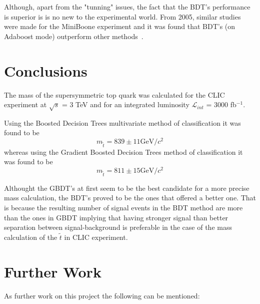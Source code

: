 \documentclass[12pt,a4paper]{report}
\begin{document}
Although, apart from the "tunning" issues, the fact that the BDT's performance is superior is is no 
new to the experimental world. From 2005, similar studies were made for the MiniBoone experiment and 
it was found that BDT's (on Adaboost mode) outperform other methods~\cite{yang2005studies}.

\chapter{Conclusions}


The mass of the supersymmetric top quark was calculated for the CLIC experiment at $\surd s$ = 3 TeV and for 
an integrated luminosity $\mathcal{L}_{int}$ = 3000 fb$^{-1}$.

Using the Boosted Decision Trees multivariate method of classification it was found to be 
\begin{equation}
 m_{\tilde{t}} = 839 \pm 11 \textrm{GeV}/c^{2}
\end{equation}
whereas using the Gradient Boosted Decision Trees method of classification it was found to be 
\begin{equation}
  m_{\tilde{t}} = 811 \pm 15 \textrm{GeV}/c^{2}
\end{equation}

Althought the GBDT's at first seem to be the best candidate for a more precise mass calculation, the BDT's 
proved to be the ones that offered a better one. That is because the resulting number of signal events in the BDT 
method are more than the ones in GBDT implying that having stronger signal than better separation between 
signal-background is preferable in the case of the mass calculation of the $\tilde{t}$ in CLIC experiment.





\chapter{Further Work}

As further work on this project the following can be mentioned:
\end{document}
